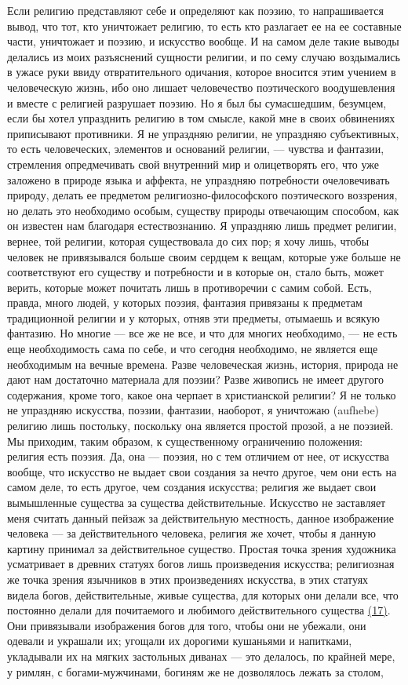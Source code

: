 \documentclass[12pt]{article}
\begin{document}
Если религию представляют себе и определяют как поэзию, то напрашивается вывод, что тот, кто уничтожает религию, то есть кто разлагает ее на ее составные части, уничтожает и поэзию, и искусство вообще. И на самом деле такие выводы делались из моих разъяснений сущности религии, и по сему случаю воздымались в ужасе руки ввиду отвратительного одичания, которое вносится этим учением в человеческую жизнь, ибо оно лишает человечество поэтического воодушевления и вместе с религией разрушает поэзию. Но я был бы сумасшедшим, безумцем, если бы хотел упразднить религию в том смысле, какой мне в своих обвинениях приписывают противники. Я не упраздняю религии, не упраздняю субъективных, то есть человеческих, элементов и оснований религии, --- чувства и фантазии, стремления опредмечивать свой внутренний мир и олицетворять его, что уже заложено в природе языка и аффекта, не упраздняю потребности очеловечивать природу, делать ее предметом религиозно-философского поэтического воззрения, но делать это необходимо особым, существу природы отвечающим способом, как он известен нам благодаря естествознанию. Я упраздняю лишь предмет религии, вернее, той религии, которая существовала до сих пор; я хочу лишь, чтобы человек не привязывался больше своим сердцем к вещам, которые уже больше не соответствуют его существу и потребности и в которые он, стало быть, может верить, которые может почитать лишь в противоречии с самим собой. Есть, правда, много людей, у которых поэзия, фантазия привязаны к предметам традиционной религии и у которых, отняв эти предметы, отымаешь и всякую фантазию. Но многие --- все же не все, и что для многих необходимо, --- не есть еще необходимость сама по себе, и что сегодня необходимо, не является еще необходимым на вечные времена. Разве человеческая жизнь, история, природа не дают нам достаточно материала для поэзии? Разве живопись не имеет другого содержания, кроме того, какое она черпает в христианской религии? Я не только не упраздняю искусства, поэзии, фантазии, наоборот, я уничтожаю (aufhebe) религию лишь постольку, поскольку она является простой прозой, а не поэзией. Мы приходим, таким образом, к существенному ограничению положения: религия есть поэзия. Да, она --- поэзия, но с тем отличием от нее, от искусства вообще, что искусство не выдает свои создания за нечто другое, чем они есть на самом деле, то есть другое, чем создания искусства; религия же выдает свои вымышленные существа за существа действительные. Искусство не заставляет меня считать данный пейзаж за действительную местность, данное изображение человека --- за действительного человека, религия же хочет, чтобы я данную картину принимал за действительное существо. Простая точка зрения художника усматривает в древних статуях богов лишь произведения искусства; религиозная же точка зрения язычников в этих произведениях искусства, в этих статуях видела богов, действительные, живые существа, для которых они делали все, что постоянно делали для почитаемого и любимого действительного существа \hyperlink{17}{(17)}\hypertarget{b17}{}. Они привязывали изображения богов для того, чтобы они не убежали, они одевали и украшали их; угощали их дорогими кушаньями и напитками, укладывали их на мягких застольных диванах --- это делалось, по крайней мере, у римлян, с богами-мужчинами, богиням же не дозволялось лежать за столом, 
\end{document}

